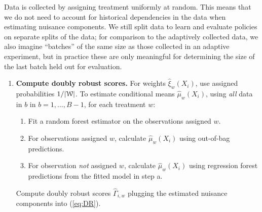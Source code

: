 \documentclass[letterpaper, 12pt, parskip=full,DIV=10]{scrartcl}
\begin{document}
Data is collected by assigning treatment uniformly at random. This means that we do not need to account for historical dependencies in the data when estimating nuisance components. We still split data to learn and evaluate policies on separate splits of the data; for comparison to the adaptively collected data, we also imagine ``batches'' of the same size as those collected in an adaptive experiment, but in practice these are only meaningful for determining the size of the last batch held out for evaluation. 
\begin{enumerate}
  \item \textbf{Compute doubly robust scores.} For weights  $\hat\xi_w(X_i)$, use assigned probabilities $1/|{\EuScript W}|$. To estimate conditional means $\hat \mu_w(X_i)$, using \textit{all} data in $b$ in $b = 1, \dots, B-1$, for each treatment $w$:
\begin{enumerate}
\item Fit a random forest estimator on the observations assigned $w$. 
\item For observations assigned $w$, calculate $\hat\mu_w(X_i)$ using out-of-bag predictions. 
\item For observation \textit{not} assigned $w$, calculate $\hat\mu_w(X_i)$ using regression forest predictions from the fitted model in step a. 
\end{enumerate}
 Compute doubly robust scores $\hat{\Gamma}_{i,w}$ plugging the estimated nuisance components into (\ref{eq:DR}). 

\end{enumerate}
\end{document}
